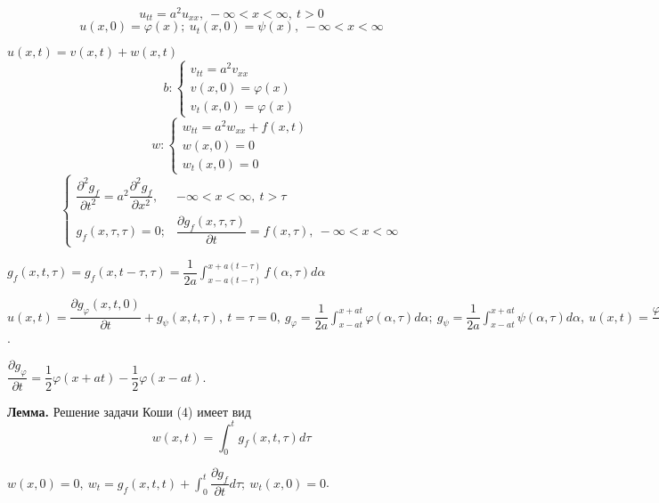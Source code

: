 \documentclass[9pt]{article}
\begin{document}
\ 
\begin{equation}
    u_{tt}=a^2u_{xx},\ -\infty<x<\infty,\ t>0
\end{equation}
\begin{equation}
    u(x,0)=\varphi(x);\ u_t(x,0)=\psi(x),\ -\infty<x<\infty
\end{equation}
\par\(u(x,t)=v(x,t)+w(x,t)\)
\begin{equation}
    b:\left\{
\begin{array}{l}
    v_{tt}=a^2v_{xx} \\
    v(x,0)=\varphi(x) \\
    v_t(x,0)=\varphi(x)
\end{array}\right.
\end{equation}
\begin{equation}
    w:\left\{
\begin{array}{l}
    w_{tt}=a^2w_{xx}+f(x,t) \\
    w(x,0)=0 \\
    w_t(x,0)=0
\end{array}\right.
\end{equation}
\begin{equation}
    \left\{\begin{array}{ll}
        \dfrac{\partial^2g_f}{\partial t^2}=a^2\dfrac{\partial^2g_f}{\partial x^2}, & -\infty<x<\infty,\ t>\tau\\
        g_f(x,\tau,\tau)=0; & \dfrac{\partial g_f(x,\tau,\tau)}{\partial t}=f(x,\tau),\ -\infty<x<\infty
    \end{array}\right.
\end{equation}
\par\(g_f(x,t,\tau)=g_f(x,t-\tau,\tau)=\dfrac{1}{2a}\int_{x-a(t-\tau)}^{x+a(t-\tau)}f(\alpha,\tau)d\alpha\)
\par\(u(x,t)=\dfrac{\partial g_\varphi(x,t,0)}{\partial t}+g_\psi(x,t,\tau),\ t=\tau=0,\ g_\varphi=\dfrac{1}{2a}\int_{x-at}^{x+at}\varphi(\alpha,\tau)d\alpha;\ g_\psi=\dfrac{1}{2a}\int_{x-at}^{x+at}\psi(\alpha,\tau)d\alpha,\ u(x,t)=\dfrac{\varphi(x+at)+\varphi(x-at)}{2}+\dfrac{1}{2a}\int_{x-at}^{x+at}\psi(\alpha)d\alpha\).
\par\(\dfrac{\partial g_\varphi}{\partial t}=\dfrac{1}{2}\varphi(x+at)-\dfrac{1}{2}\varphi(x-at)\).
\par\textbf{Лемма.} Решение задачи Коши (4) имеет вид
\begin{equation}
    w(x,t)=\int_0^tg_f(x,t,\tau)d\tau
\end{equation}
\par\(w(x,0)=0,\ w_t=g_f(x,t,t)+\int_0^t\dfrac{\partial g_f}{\partial t}d\tau;\ w_t(x,0)=0\).
\end{document}
